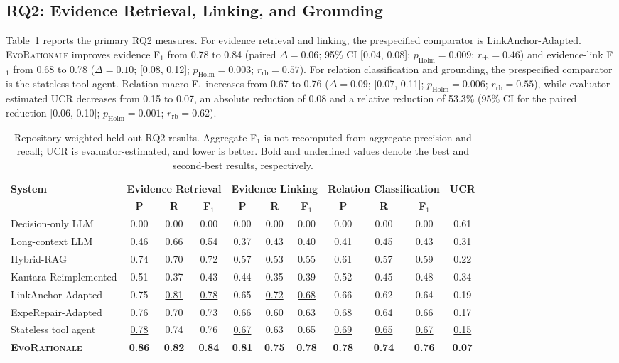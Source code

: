 \documentclass[10pt,conference]{IEEEtran}
\begin{document}
\subsection{RQ2: Evidence Retrieval, Linking, and Grounding}
\label{subsec:results-rq2}
Table~\ref{tab:rq2-results} reports the primary RQ2 measures. For evidence retrieval and linking, the prespecified comparator is LinkAnchor-Adapted. \textsc{EvoRationale} improves evidence F$_1$ from 0.78 to 0.84 (paired $\Delta=0.06$; 95\% CI [0.04, 0.08]; $p_{\mathrm{Holm}}=0.009$; $r_{\mathrm{rb}}=0.46$) and evidence-link F$_1$ from 0.68 to 0.78 ($\Delta=0.10$; [0.08, 0.12]; $p_{\mathrm{Holm}}=0.003$; $r_{\mathrm{rb}}=0.57$). For relation classification and grounding, the prespecified comparator is the stateless tool agent. Relation macro-F$_1$ increases from 0.67 to 0.76 ($\Delta=0.09$; [0.07, 0.11]; $p_{\mathrm{Holm}}=0.006$; $r_{\mathrm{rb}}=0.55$), while evaluator-estimated UCR decreases from 0.15 to 0.07, an absolute reduction of 0.08 and a relative reduction of 53.3\% (95\% CI for the paired reduction [0.06, 0.10]; $p_{\mathrm{Holm}}=0.001$; $r_{\mathrm{rb}}=0.62$).
\begin{table}[!t]
\caption{Repository-weighted held-out RQ2 results. Aggregate F$_1$ is not recomputed from aggregate precision and recall; UCR is evaluator-estimated, and lower is better. Bold and underlined values denote the best and second-best results, respectively.}
\label{tab:rq2-results}
\centering
\scriptsize
\renewcommand{\arraystretch}{1.06}
\setlength{\tabcolsep}{3.8pt}
\begin{tabular*}{\textwidth}{@{\extracolsep{\fill}}lcccccccccc@{}}
\toprule
\multirow{2}{*}{\textbf{System}}&\multicolumn{3}{c}{\textbf{Evidence Retrieval}}&\multicolumn{3}{c}{\textbf{Evidence Linking}}&\multicolumn{3}{c}{\textbf{Relation Classification}}&\multirow{2}{*}{\textbf{UCR}}\\
\cmidrule(lr){2-4}\cmidrule(lr){5-7}\cmidrule(lr){8-10}
&\textbf{P}&\textbf{R}&\textbf{F$_1$}&\textbf{P}&\textbf{R}&\textbf{F$_1$}&\textbf{P}&\textbf{R}&\textbf{F$_1$}&\\
\midrule
Decision-only LLM&0.00&0.00&0.00&0.00&0.00&0.00&0.00&0.00&0.00&0.61\\
Long-context LLM&0.46&0.66&0.54&0.37&0.43&0.40&0.41&0.45&0.43&0.31\\
Hybrid-RAG&0.74&0.70&0.72&0.57&0.53&0.55&0.61&0.57&0.59&0.22\\
Kantara-Reimplemented&0.51&0.37&0.43&0.44&0.35&0.39&0.52&0.45&0.48&0.34\\
LinkAnchor-Adapted&0.75&\underline{0.81}&\underline{0.78}&0.65&\underline{0.72}&\underline{0.68}&0.66&0.62&0.64&0.19\\
ExpeRepair-Adapted&0.76&0.70&0.73&0.66&0.60&0.63&0.68&0.64&0.66&0.17\\
Stateless tool agent&\underline{0.78}&0.74&0.76&\underline{0.67}&0.63&0.65&\underline{0.69}&\underline{0.65}&\underline{0.67}&\underline{0.15}\\
\textbf{\textsc{EvoRationale}}&\textbf{0.86}&\textbf{0.82}&\textbf{0.84}&\textbf{0.81}&\textbf{0.75}&\textbf{0.78}&\textbf{0.78}&\textbf{0.74}&\textbf{0.76}&\textbf{0.07}\\
\bottomrule
\end{tabular*}
\end{table}
\end{document}
